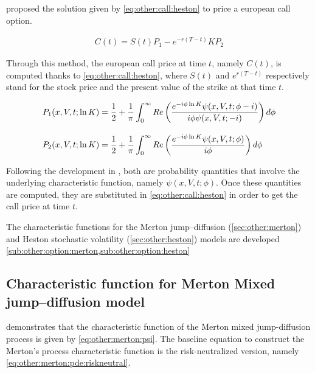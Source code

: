 \documentclass[a4paper, 12pt]{report}
\begin{document}
\citet{heston1993} proposed the solution given by \cref{eq:other:call:heston} to price a european call option.

\begin{align}
  C(t) = S(t) P_1 - e^{-r(T-t)} K P_2 \label{eq:other:call:heston}
\end{align}

Through this method, the european call price at time $t$, namely $C(t)$, is computed thanks to \cref{eq:other:call:heston}, where $S(t)$ and $e^{r(T - t)}$ respectively stand for the stock price and the present value of the strike at that time $t$.

\begin{align}
  P_1(x,V,t;\ln{K}) &= \frac{1}{2} + \frac{1}{\pi} \int_0^{\infty} Re \left( \frac{e^{-i\phi\ln{K}} \psi(x,V,t;\phi - i)}{i\phi\psi(x,V,t;-i)} \right) d\phi \label{eq:other:call:heston:pi1} \\ 
  \intertext{}
  P_2(x,V,t;\ln{K}) &= \frac{1}{2} + \frac{1}{\pi} \int_0^{\infty} Re \left( \frac{e^{-i\phi\ln{K}} \psi(x,V,t;\phi)}{i\phi} \right) d\phi \label{eq:other:call:heston:pi2}
\end{align}

Following the development in \citet{criso2015},  both are probability quantities that involve the underlying characteristic function, namely $\psi(x,V,t;\phi)$. Once these quantities are computed, they are substituted in \cref{eq:other:call:heston} in order to get the call price at time $t$.

The characteristic functions for the Merton jump--diffusion (\cref{sec:other:merton}) and Heston stochastic volatility (\cref{sec:other:heston}) models are developed \cref{sub:other:option:merton,sub:other:option:heston}



\subsection{Characteristic function for Merton Mixed jump--diffusion model}
\label{sub:other:option:merton}

\citet{matsuda2004} demonstrates that the characteristic function of the Merton mixed jump-diffusion process is given by \cref{eq:other:merton:psi}. The baseline equation to construct the Merton's process characteristic function is the risk-neutralized version, namely \cref{eq:other:merton:pde:riskneutral}.
\end{document}
